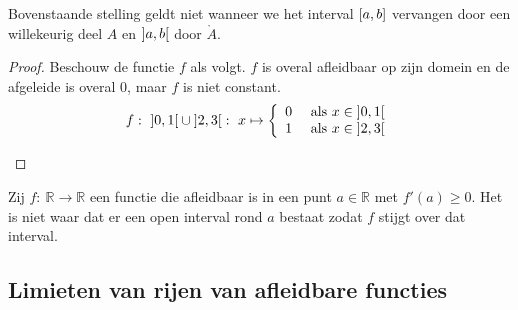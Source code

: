 \documentclass[main.tex]{subfiles}
\begin{document}
\begin{tvb}
  Bovenstaande stelling geldt niet wanneer we het interval $\interval{a}{b}$ vervangen door een willekeurig deel $A$ en $\interval[open]{a}{b}$ door $\mathring{A}$.
  \begin{proof}
    Beschouw de functie $f$ als volgt. $f$ is overal afleidbaar op zijn domein en de afgeleide is overal $0$, maar $f$ is niet constant.
    \[
    f:\ \interval[open]{0}{1}\cup \interval[open]{2}{3}:\ x \mapsto
    \left\{
      \begin{array}{rl}
        0 & \text{ als } x \in \interval[open]{0}{1}\\
        1 & \text{ als } x \in \interval[open]{2}{3}
      \end{array}
    \right.
    \]
    \begin{figure}[H]
      \centering
    \end{figure}
  \end{proof}
\end{tvb}

\begin{gst}
  Zij $f:\ \mathbb{R} \rightarrow \mathbb{R}$ een functie die afleidbaar is in een punt $a\in \mathbb{R}$ met $f'(a) \ge 0$.
  Het is niet waar dat er een open interval rond $a$ bestaat zodat $f$ stijgt over dat interval.
\end{gst}

\subsection{Limieten van rijen van afleidbare functies}
\label{sec:limieten-van-rijen}
\end{document}
